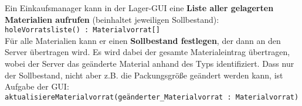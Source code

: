 Ein Einkaufsmanager kann in der Lager-GUI eine \textbf{Liste aller gelagerten Materialien aufrufen} (beinhaltet jeweiligen Sollbestand):\\
\medskip
\texttt{holeVorratsliste() : Materialvorrat[]}\\
\medskip
Für alle Materialien kann er einen \textbf{Sollbestand festlegen}, der dann an den Server übertragen wird. Es wird dabei der gesamte Materialeintrag übertragen, wobei der Server das geänderte Material anhand des Typs identifiziert. Dass nur der Sollbestand, nicht aber z.B. die Packungsgröße geändert werden kann, ist Aufgabe der GUI:\\
\medskip
\texttt{aktualisiereMaterialvorrat(geänderter\_Materialvorrat : Materialvorrat)}